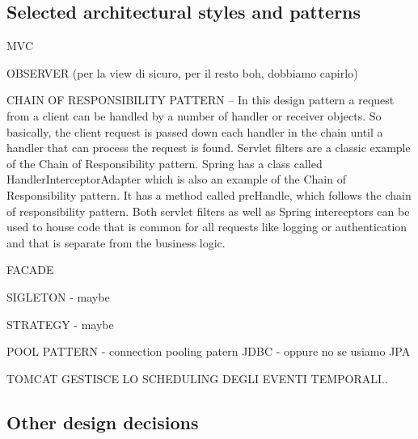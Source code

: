 \subsection{Selected architectural styles and patterns}
\label{subsect:selectedarchitecturalstylesandpatterns}

MVC

OBSERVER (per la view di sicuro, per il resto boh, dobbiamo capirlo)

CHAIN OF RESPONSIBILITY PATTERN – In this design pattern a request from a client can be handled by a number of handler or receiver objects. So basically, the client request is passed down each handler in the chain until a handler that can process the request is found. Servlet filters are a classic example of the Chain of Responsibility pattern. Spring has a class called HandlerInterceptorAdapter which is also an example of the Chain of Responsibility pattern. It has a method called preHandle, which follows the chain of responsibility pattern. Both servlet filters as well as Spring interceptors can be used to house code that is common for all requests like logging or authentication and that is separate from the business logic.

FACADE

SIGLETON - maybe

STRATEGY - maybe

POOL PATTERN - connection pooling patern JDBC - oppure no se usiamo JPA

TOMCAT GESTISCE LO SCHEDULING DEGLI EVENTI TEMPORALI..

\subsection{Other design decisions}
\label{subsect:otherdesigndecisions}


